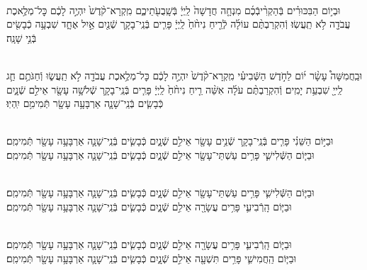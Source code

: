 \documentclass[twoside, openany, parskip=half, 11pt]{book}
\begin{document}
\\
וּבְי֣וֹם הַבִּכּוּרִ֗ים בְּֿהַקְרִ֨יבְֿכֶ֜ם מִנְחָ֤ה חֲדָשָׁה֙ לַֽיְיָ֔ בְּֿשָֽׁבֻעֹ֖תֵיכֶ֑ם מִֽקְרָא־קֹ֨דֶשׁ֙ יִהְיֶ֣ה לָכֶ֔ם כׇּל־מְלֶ֥אכֶת עֲבֹדָ֖ה לֹ֥א תַֽעֲשֽׂוּ׃ וְֿהִקְרַבְתֶּ֨ם עוֹלָ֜ה לְֿרֵ֤יחַ נִיחֹ֨חַ֙ לַֽיְיָ֔ פָּרִ֧ים בְּֿנֵֽי־בָקָ֛ר שְֿׁנַ֖יִם אַ֣יִל אֶחָ֑ד שִׁבְעָ֥ה כְֿבָשִׂ֖ים בְּֿנֵ֥י שָׁנָֽה׃

\clearpage

\vspace{-\baselineskip}
\\
וּבַֽחֲמִשָּׁה֩ עָשָׂ֨ר י֜וֹם לַחֹ֣דֶשׁ הַשְּֿׁבִיעִ֗י מִֽקְרָא־קֹ֨דֶשׁ֙ יִהְיֶ֣ה לָכֶ֔ם כׇּל־מְלֶ֥אכֶת עֲבֹדָ֖ה לֹ֣א תַֽעֲשׂ֑וּ וְֿחַגֹּתֶ֥ם חַ֛ג לַֽייָ֖ שִׁבְעַ֥ת יָמִֽים׃ וְֿהִקְרַבְתֶּ֨ם עֹלָ֜ה אִשֵּׁ֨ה רֵ֤יחַ נִיחֹ֨חַ֙ לַֽיְיָ֔ פָּרִ֧ים בְּֿנֵֽי־בָקָ֛ר שְֿׁלֹשָׁ֥ה עָשָׂ֖ר אֵילִ֣ם שְֿׁנָ֑יִם כְּֿבָשִׂ֧ים בְּֿנֵֽי־שָׁנָ֛ה אַרְבָּעָ֥ה עָשָׂ֖ר תְּֿמִימִ֥ם יִֽהְיֽוּ׃



\\
וּבַיּ֣וֹם הַשֵּׁנִ֗י פָּרִ֧ים בְּֿנֵֽי־בָקָ֛ר שְֿׁנֵ֥ים עָשָׂ֖ר אֵילִ֣ם שְֿׁנָ֑יִם כְּֿבָשִׂ֧ים בְּֿנֵֽי־שָׁנָ֛ה אַרְבָּעָ֥ה עָשָׂ֖ר תְּֿמִימִֽם׃
\\
וּבַיּ֧וֹם הַשְּֿׁלִישִׁ֛י פָּרִ֥ים עַשְׁתֵּי־עָשָׂ֖ר אֵילִ֣ם שְֿׁנָ֑יִם כְּֿבָשִׂ֧ים בְּֿנֵֽי־שָׁנָ֛ה אַרְבָּעָ֥ה עָשָׂ֖ר תְּֿמִימִֽם׃



\\
וּבַיּ֧וֹם הַשְּֿׁלִישִׁ֛י פָּרִ֥ים עַשְׁתֵּי־עָשָׂ֖ר אֵילִ֣ם שְֿׁנָ֑יִם כְּֿבָשִׂ֧ים בְּֿנֵֽי־שָׁנָ֛ה אַרְבָּעָ֥ה עָשָׂ֖ר תְּֿמִימִֽם׃
\\
וּבַיּ֧וֹם הָֽרְֿבִיעִ֛י פָּרִ֥ים עֲשָׂרָ֖ה אֵילִ֣ם שְֿׁנָ֑יִם כְּֿבָשִׂ֧ים בְּֿנֵֽי־שָׁנָ֛ה אַרְבָּעָ֥ה עָשָׂ֖ר תְּֿמִימִֽם׃



\\
וּבַיּ֧וֹם הָֽרְֿבִיעִ֛י פָּרִ֥ים עֲשָׂרָ֖ה אֵילִ֣ם שְֿׁנָ֑יִם כְּֿבָשִׂ֧ים בְּֿנֵֽי־שָׁנָ֛ה אַרְבָּעָ֥ה עָשָׂ֖ר תְּֿמִימִֽם׃
\\
וּבַיּ֧וֹם הַֽחֲמִישִׁ֛י פָּרִ֥ים תִּשְׁעָ֖ה אֵילִ֣ם שְֿׁנָ֑יִם כְּֿבָשִׂ֧ים בְּֿנֵֽי־שָׁנָ֛ה אַרְבָּעָ֥ה עָשָׂ֖ר תְּֿמִימִֽם׃
\end{document}
